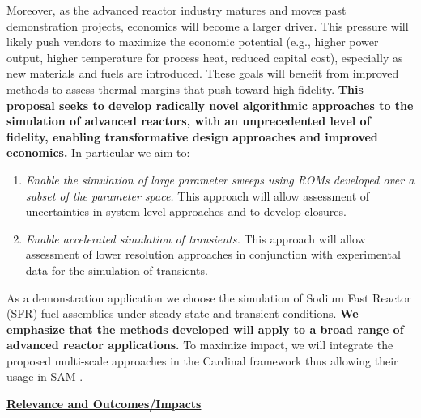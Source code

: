 Moreover, as the advanced reactor industry matures and moves past demonstration
projects, economics will become a larger driver. This pressure will likely push
vendors to maximize the economic potential (e.g., higher power output,
higher temperature for process heat, reduced capital cost), especially as new
materials and fuels are introduced. These goals will benefit from
improved methods to assess thermal margins that push toward high fidelity.
\textbf{This proposal seeks to develop radically novel algorithmic approaches
to the simulation of advanced reactors, with an unprecedented level of
fidelity, enabling transformative design approaches and improved economics.}
In particular we aim to: \\[-2ex]
\begin{enumerate}
%
   \item \textit{Enable the simulation of large parameter sweeps using
   ROMs developed over a subset of the parameter space.} This approach
   will allow assessment of uncertainties in system-level approaches 
   and to develop closures.
%
   \item \textit{Enable accelerated simulation of transients.}
   This approach will allow assessment of lower resolution approaches in
   conjunction with experimental data for the simulation of transients.
\\[-3ex]
\end{enumerate}
As a demonstration application we choose the simulation of Sodium Fast Reactor
(SFR) fuel assemblies under steady-state and transient conditions. \textbf{We
emphasize that the methods developed will apply to a broad range of advanced
reactor applications.} To maximize impact, we will integrate the proposed
multi-scale approaches in the Cardinal \cite{cardinal} framework thus allowing
their usage in SAM \cite{hu2021}. 








\vspace*{.05in}\noindent \underline{\textbf{Relevance and Outcomes/Impacts}} \\[-2ex]




